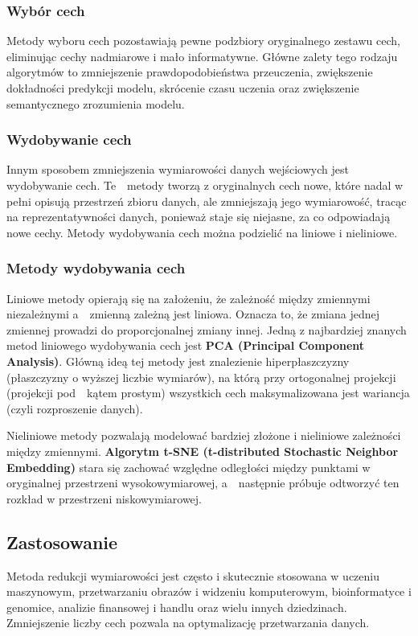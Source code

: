 		
		\subsubsection{Wybór cech}
			Metody wyboru cech pozostawiają pewne podzbiory oryginalnego zestawu cech, eliminując cechy nadmiarowe i mało informatywne. Główne zalety tego rodzaju algorytmów to zmniejszenie prawdopodobieństwa przeuczenia, zwiększenie dokładności predykcji modelu, skrócenie czasu uczenia oraz zwiększenie semantycznego zrozumienia modelu.			
		
		\subsubsection{Wydobywanie cech}	
			Innym sposobem zmniejszenia wymiarowości danych wejściowych jest wydobywanie cech. Te~~metody tworzą z oryginalnych cech nowe, które nadal w pełni opisują przestrzeń zbioru danych, ale zmniejszają jego wymiarowość, tracąc na reprezentatywności danych, ponieważ staje się niejasne, za co odpowiadają nowe cechy. Metody wydobywania cech można podzielić na liniowe i nieliniowe.

		\subsubsection{Metody wydobywania cech}
			Liniowe metody opierają się na założeniu, że zależność między zmiennymi niezależnymi a~~zmienną zależną jest liniowa. Oznacza to, że zmiana jednej zmiennej prowadzi do proporcjonalnej zmiany innej. Jedną z najbardziej znanych metod liniowego wydobywania cech jest \textbf{PCA (Principal Component Analysis)}. Główną ideą tej metody jest znalezienie hiperpłaszczyzny (płaszczyzny o wyższej liczbie wymiarów), na którą przy ortogonalnej projekcji (projekcji pod~~kątem prostym) wszystkich cech maksymalizowana jest wariancja (czyli rozproszenie danych).
		
			Nieliniowe metody pozwalają modelować bardziej złożone i nieliniowe zależności między zmiennymi. \textbf{Algorytm t-SNE (t-distributed Stochastic Neighbor Embedding)} stara się zachować względne odległości między punktami w oryginalnej przestrzeni wysokowymiarowej, a~~następnie próbuje odtworzyć ten rozkład w przestrzeni niskowymiarowej.

	\subsection{Zastosowanie}
		Metoda redukcji wymiarowości jest często i skutecznie stosowana w uczeniu maszynowym, przetwarzaniu obrazów i widzeniu komputerowym, bioinformatyce i genomice, analizie finansowej i handlu oraz wielu innych dziedzinach. Zmniejszenie liczby cech pozwala na optymalizację przetwarzania danych.



